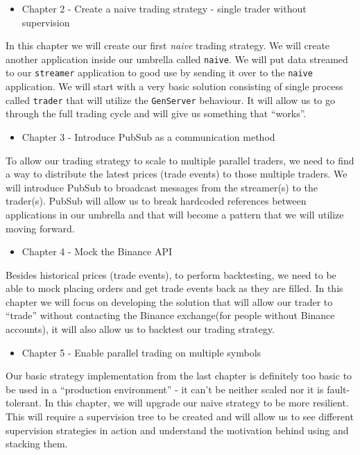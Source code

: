 \documentclass[
  oneside]{book}
\providecommand{\tightlist}{%
  \setlength{\itemsep}{0pt}\setlength{\parskip}{0pt}}
\begin{document}
\begin{itemize}
\tightlist
\item
  Chapter 2 - Create a naive trading strategy - single trader without supervision
\end{itemize}

In this chapter we will create our first \emph{naive} trading strategy. We will create another application inside our umbrella called \texttt{naive}. We will put data streamed to our \texttt{streamer} application to good use by sending it over to the \texttt{naive} application. We will start with a very basic solution consisting of single process called \texttt{trader} that will utilize the \texttt{GenServer} behaviour. It will allow us to go through the full trading cycle and will give us something that ``works''.

\begin{itemize}
\tightlist
\item
  Chapter 3 - Introduce PubSub as a communication method
\end{itemize}

To allow our trading strategy to scale to multiple parallel traders, we need to find a way to distribute the latest prices (trade events) to those multiple traders. We will introduce PubSub to broadcast messages from the streamer(s) to the trader(s). PubSub will allow us to break hardcoded references between applications in our umbrella and that will become a pattern that we will utilize moving forward.

\begin{itemize}
\tightlist
\item
  Chapter 4 - Mock the Binance API
\end{itemize}

Besides historical prices (trade events), to perform backtesting, we need to be able to mock placing orders and get trade events back as they are filled. In this chapter we will focus on developing the solution that will allow our trader to ``trade'' without contacting the Binance exchange(for people without Binance accounts), it will also allow us to backtest our trading strategy.

\begin{itemize}
\tightlist
\item
  Chapter 5 - Enable parallel trading on multiple symbols
\end{itemize}

Our basic strategy implementation from the last chapter is definitely too basic to be used in a ``production environment'' - it can't be neither scaled nor it is fault-tolerant. In this chapter, we will upgrade our naive strategy to be more resilient. This will require a supervision tree to be created and will allow us to see different supervision strategies in action and understand the motivation behind using and stacking them.
\end{document}
